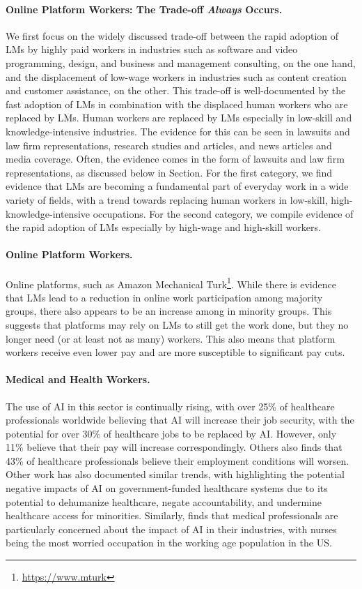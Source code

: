 \documentclass{article} %
\begin{document}
\paragraph{Online Platform Workers: The Trade-off \emph{Always} Occurs.}
We first focus on the widely discussed trade-off between the rapid adoption of LMs by highly paid workers in industries such as software and video programming, design, and business and management consulting, on the one hand, and the displacement of low-wage workers in industries such as content creation and customer assistance, on the other.
This trade-off is well-documented by the fast adoption of LMs in combination with the displaced human workers who are replaced by LMs.
Human workers are replaced by LMs especially in low-skill and knowledge-intensive industries.
The evidence for this can be seen in lawsuits and law firm representations, research studies and articles, and news articles and media coverage.
Often, the evidence comes in the form of lawsuits and law firm representations, as discussed below in Section.
For the first category, we find evidence that LMs are becoming a fundamental part of everyday work in a wide variety of fields, with a trend towards replacing human workers in low-skill, high-knowledge-intensive occupations.
For the second category, we compile evidence of the rapid adoption of LMs especially by high-wage and high-skill workers.
\paragraph{Online Platform Workers.}
Online platforms, such as Amazon Mechanical Turk\footnote{\url{https://www.mturk}}. While there is evidence that LMs lead to a reduction in online work participation among majority groups, there also appears to be an increase among in minority groups.
This suggests that platforms may rely on LMs to still get the work done, but they no longer need (or at least not as many) workers.
This also means that platform workers receive even lower pay and are more susceptible to significant pay cuts.
\paragraph{Medical and Health Workers.}
The use of AI in this sector is continually rising, with over 25\% of healthcare professionals worldwide believing that AI will increase their job security, with the potential for over 30\% of healthcare jobs to be replaced by AI.
However, only 11\%  believe that their pay will increase correspondingly. 
Others also finds that 43\% of healthcare professionals believe their employment conditions will worsen. 
Other work has also documented similar trends, with \citet{morley2020ethics} highlighting the potential negative impacts of AI on government-funded healthcare systems due to its potential to dehumanize healthcare, negate accountability, and undermine healthcare access for minorities.
Similarly, \citet{rony2024wonder} finds that medical professionals are particularly concerned about the impact of AI in their industries, with nurses being the most worried occupation in the working age population in the US. 
\end{document}
